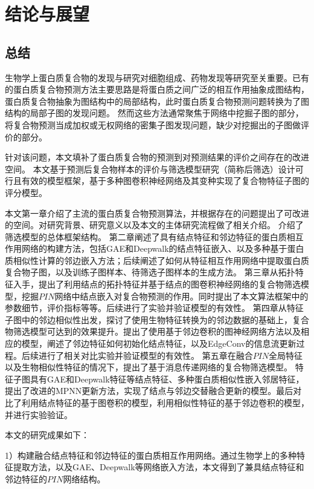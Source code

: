 \chapter{结论与展望}
\label{chapter:SummaryAndForward}

\section{总结}
\label{section:allsummary}

生物学上蛋白质复合物的发现与研究对细胞组成、药物发现等研究至关重要。已有的蛋白质复合物预测方法主要思路是将蛋白质之间广泛的相互作用抽象成图结构，蛋白质复合物抽象为图结构中的局部结构，此时蛋白质复合物预测问题转换为了图结构的局部子图的发现问题。
然而这些方法通常聚焦于网络中挖掘子图的部分，将复合物预测当成加权或无权网络的密集子图发现问题，缺少对挖掘出的子图做评价的部分。

针对该问题，本文填补了蛋白质复合物的预测到对预测结果的评价之间存在的改进空间。
本文基于预测后复合物样本的评价与筛选模型研究（简称后筛选）设计可行且有效的模型框架，基于多种图卷积神经网络及其变种实现了复合物特征子图的评分模型。

本文第一章介绍了主流的蛋白质复合物预测算法，并根据存在的问题提出了可改进的空间。对研究背景、研究意义以及本文的主体研究流程做了相关介绍。
介绍了筛选模型的总体框架结构。
第二章阐述了具有结点特征和邻边特征的蛋白质相互作用网络的构建方法，包括GAE和Deepwalk的结点特征嵌入、以及多种基于蛋白质相似性计算的邻边嵌入方法；后续阐述了如何从特征相互作用网络中提取蛋白质复合物子图，以及训练子图样本、待筛选子图样本的生成方法。
第三章从拓扑特征入手，提出了利用结点的拓扑特征并基于结点的图卷积神经网络的复合物筛选模型，挖掘$PIN$网络中结点嵌入对复合物预测的作用。同时提出了本文算法框架中的参数细节，评价指标等等。后续进行了实验并验证模型的有效性。
第四章从特征子图中的邻边相似性出发，探讨了使用生物特征转换为的邻边数据的基础上，复合物筛选模型可达到的效果提升。提出了使用基于邻边卷积的图神经网络方法以及相应的模型，阐述了邻边特征如何初始化结点特征，以及EdgeConv的信息流更新过程。后续进行了相关对比实验并验证模型的有效性。
第五章在融合$PIN$全局特征以及生物相似性特征的情况下，提出了基于消息传递网络的复合物筛选模型。
特征子图具有GAE和Deepwalk特征等结点特征、多种蛋白质相似性嵌入邻居特征，提出了改进的MPNN更新方法，实现了结点与邻边交替融合更新的模型。最后对比了利用结点特征的基于图卷积的模型，利用相似性特征的基于邻边卷积的模型，并进行实验验证。

本文的研究成果如下：

1）构建融合结点特征和邻边特征的蛋白质相互作用网络。通过生物学上的多种特征提取方法，以及GAE、Deepwalk等网络嵌入方法，本文得到了兼具结点特征和邻边特征的$PIN$网络结构。

